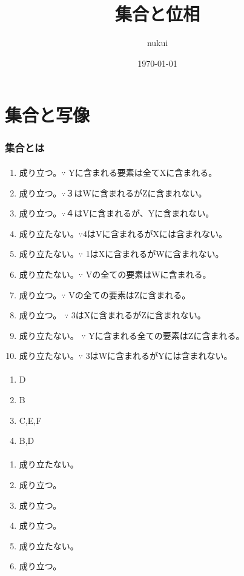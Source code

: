 \documentclass{jsarticle}
\begin{document}
\title{集合と位相}
\author{nukui}
\date{\today}
\maketitle

\part{集合と写像}
\section{集合とは}
\subsection{}
\begin{enumerate}
\item 成り立つ。$\because$ Yに含まれる要素は全てXに含まれる。
\item 成り立つ。$\because$３はWに含まれるがZに含まれない。
\item 成り立つ。$\because$４はVに含まれるが、Yに含まれない。
\item 成り立たない。$\because$4はVに含まれるがXには含まれない。
\item 成り立たない。$\because$ 1はXに含まれるがWに含まれない。
\item 成り立たない。$\because$ Vの全ての要素はWに含まれる。
\item 成り立つ。$\because$ Vの全ての要素はZに含まれる。
\item 成り立つ。 $\because$ 3はXに含まれるがZに含まれない。
\item 成り立たない。 $\because$ Yに含まれる全ての要素はZに含まれる。
\item 成り立たない。$\because$ 3はWに含まれるがYには含まれない。
\end{enumerate}

\subsection{}
\begin{enumerate}
\item D
\item B
\item C,E,F
\item B,D
\end{enumerate}

\subsection{}
\begin{enumerate}
\item 成り立たない。
\item 成り立つ。
\item 成り立つ。
\item 成り立つ。
\item 成り立たない。
\item 成り立つ。
\end{enumerate}
\end{document}
